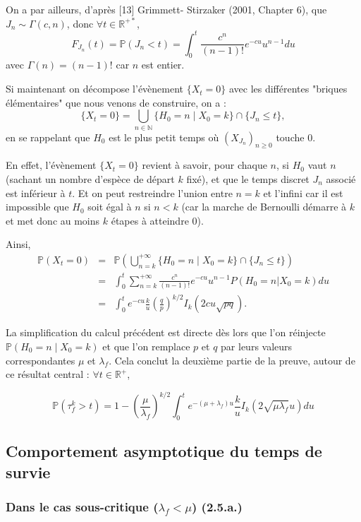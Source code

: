 \documentclass[12pt,a4paper]{article}
\begin{document}
On a par ailleurs, d'après [13] Grimmett- Stirzaker (2001, Chapter 6), que $J_n \sim \Gamma(c,n)$, donc $\forall t \in \mathbb{R}^{+*}$, $$ 
F_{J_n}(t) = \mathbb{P}(J_n < t) = \int_0^t \frac{c^n}{(n-1)!} e^{-cu} u^{n-1} du $$ avec $\Gamma(n) = (n-1)!$ car $n$ est entier. \par

Si maintenant on décompose l'évènement $\{X_t=0\}$ avec les différentes "briques élémentaires" que nous venons de construire, on a : 
$$ \{X_t=0\} = \bigcup\limits_{n \in \mathbb{N}} \{H_0=n \mid X_0=k\} \cap \{J_n \leq t\}, $$ en se rappelant que $H_0$ est le plus petit temps où $(X_{J_n})_{n \geq 0}$ touche $0$. 

En effet, l'évènement $\{X_t=0\}$ revient à savoir, pour chaque $n$, si $H_0$ vaut $n$ (sachant un nombre d'espèce de départ $k$ fixé), et que le temps discret $J_n$ associé est inférieur à $t$. Et on peut restreindre l'union entre $n=k$ et l'infini car il est impossible que $H_0$ soit égal à $n$ si $n<k$ (car la marche de Bernoulli démarre à $k$ et met donc au moins $k$ étapes à atteindre $0$). 

Ainsi, \begin{eqnarray*}
    \mathbb{P}(X_t=0) & = & \mathbb{P}(\bigcup\limits_{n=k}^{+\infty} \{H_0=n \mid X_0=k\} \cap \{J_n \leq t\}) \\
    & = & \int_0^t \sum_{n=k}^{+\infty} \frac{c^n}{(n-1)!} e^{-cu} u^{n-1} P(H_0=n|X_0=k) du \\
    & = & \int_0^t e^{-cu} \frac{k}{u} (\frac{q}{p})^{k/2} I_k(2cu \sqrt{pq}).
\end{eqnarray*}

La simplification du calcul précédent est directe dès lors que l'on réinjecte $\mathbb{P}(H_0=n \mid X_0=k)$ et que l'on remplace $p$ et $q$ par leurs valeurs correspondantes $\mu$ et $\lambda_f$. Cela conclut la deuxième partie de la preuve, autour de ce résultat central : $\forall t \in \mathbb{R}^+$, 

$$ \boxed{\mathbb{P}(\tau_f^k>t)=1-(\frac{\mu}{\lambda_f})^{k/2} \int_0^t e^{-(\mu+\lambda_f)u} \frac{k}{u} I_k(2\sqrt{\mu\lambda_f}u) du} $$

\subsection{Comportement asymptotique du temps de survie}

\subsubsection{Dans le cas sous-critique (\texorpdfstring{$\lambda_f < \mu$}{}) (2.5.a.)}
\end{document}
